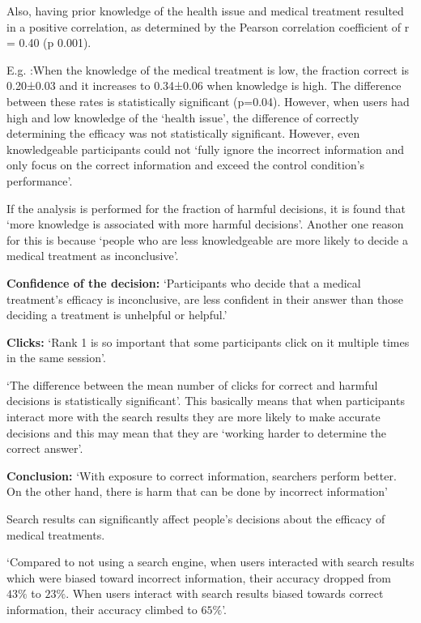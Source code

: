 \documentclass[]{article}
\begin{document}
Also, having prior knowledge of the health issue and medical treatment resulted in a positive correlation, as determined by the Pearson correlation coefficient of r = 0.40 (p 0.001).

E.g. :When the knowledge of the medical treatment is low, the fraction correct is 0.20±0.03 and it increases to 0.34±0.06 when knowledge is high. The difference between these rates is statistically significant (p=0.04). However, when users had high and low knowledge of the ‘health issue’, the difference of correctly determining the efficacy was not statistically significant. 
However, even knowledgeable participants could not ‘fully ignore the incorrect information and only focus on the correct information and exceed the control condition’s performance’.  

If the analysis is performed for the fraction of harmful decisions, it is found that ‘more knowledge is associated with more harmful decisions’. Another one reason for this is because ‘people who are less knowledgeable are more likely to decide a medical treatment as inconclusive’. 

\textbf{Confidence of the decision:} ‘Participants who decide that a medical treatment’s efficacy is inconclusive, are less confident in their answer than those deciding a treatment is unhelpful or helpful.’ 
 
\textbf{Clicks:} ‘Rank 1 is so important that some participants click on it multiple times in the same session’.

‘The difference between the mean number of clicks for correct and harmful decisions is statistically significant’. This basically means that when participants interact more with the search results they are more likely to make accurate decisions and this may mean that they are ‘working harder to determine the correct answer’.
 
\textbf{Conclusion:} ‘With exposure to correct information, searchers perform better. On the other hand, there is harm that can be done by incorrect information’

Search results can significantly affect people’s decisions about the efficacy of medical treatments.

‘Compared to not using a search engine, when users interacted with search results which were biased toward incorrect information, their accuracy dropped from $43\%$ to $23\%$. When users interact with search results biased towards correct information, their accuracy climbed to $65\%$’.
\end{document}
